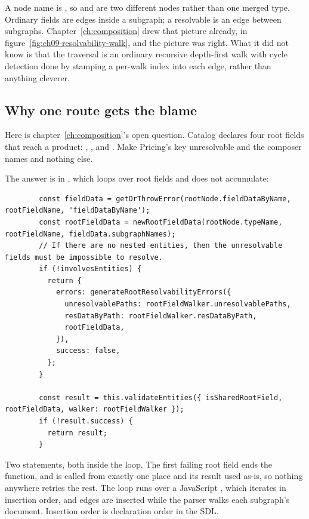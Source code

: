 A node name is , so  and
 are two different nodes rather than one merged type.
Ordinary fields are edges inside a subgraph; a resolvable  is an edge
between subgraphs. Chapter~\ref{ch:composition} drew that picture already, in
figure~\ref{fig:ch09-resolvability-walk}, and the picture was right. What it did
not know is that the traversal is an ordinary recursive depth-first walk with
cycle detection done by stamping a per-walk index into each edge, rather than
anything cleverer.

\subsection*{Why one route gets the blame}

%
Here is chapter~\ref{ch:composition}'s open question. Catalog declares four root
fields that reach a product: , ,
 and . Make Pricing's key unresolvable and
the composer names  and nothing else.

The answer is in , which loops over root fields and does
not accumulate:

\begin{verbatim}
        const fieldData = getOrThrowError(rootNode.fieldDataByName, rootFieldName, 'fieldDataByName');
        const rootFieldData = newRootFieldData(rootNode.typeName, rootFieldName, fieldData.subgraphNames);
        // If there are no nested entities, then the unresolvable fields must be impossible to resolve.
        if (!involvesEntities) {
          return {
            errors: generateRootResolvabilityErrors({
              unresolvablePaths: rootFieldWalker.unresolvablePaths,
              resDataByPath: rootFieldWalker.resDataByPath,
              rootFieldData,
            }),
            success: false,
          };
        }

        const result = this.validateEntities({ isSharedRootField, rootFieldData, walker: rootFieldWalker });
        if (!result.success) {
          return result;
        }
\end{verbatim}

Two  statements, both inside the loop. The first failing root field
ends the function, and  is called from exactly one place and
its result used as-is, so nothing anywhere retries the rest. The loop runs over
a JavaScript , which iterates in insertion order, and edges are
inserted while the parser walks each subgraph's document. Insertion order is
declaration order in the SDL.

